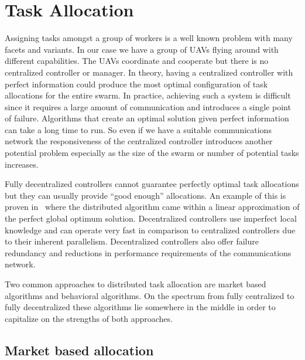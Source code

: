 \section{Task Allocation}
\label{sec:uncoordTasking}

Assigning tasks amongst a group of workers is a well known problem with many facets and variants.  In our case we have a group of UAVs flying around with different capabilities.  The UAVs coordinate and cooperate but there is no centralized controller or manager.   In theory, having a centralized controller with perfect information could produce the most optimal configuration of task allocations for the entire swarm.  In practice, achieving such a system is difficult since it requires a large amount of communication and introduces a single point of failure.  Algorithms that create an optimal solution given perfect information can take a long time to run.  So even if we have a suitable communications network the responsiveness of the centralized controller introduces another potential problem especially as the size of the swarm or number of potential tasks increases.

Fully decentralized controllers cannot guarantee perfectly optimal task allocations but they can usually provide ``good enough'' allocations.  An example of this is proven in~\cite{auction_linear_approx} where the distributed algorithm came within a linear approximation of the perfect global optimum solution.  Decentralized controllers use imperfect local knowledge and can operate very fast in comparison to centralized controllers due to their inherent parallelism.  Decentralized controllers also offer failure redundancy and reductions in performance requirements of the communications network.

Two common approaches to distributed task allocation are market based algorithms and behavioral algorithms.  On the spectrum from fully centralized to fully decentralized these algorithms lie somewhere in the middle in order to capitalize on the strengths of both approaches.

\subsection{Market based allocation}

